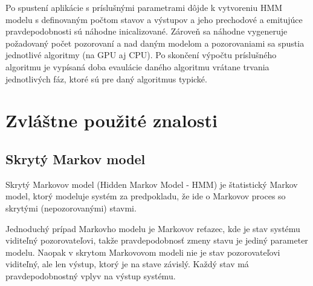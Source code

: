 \documentclass[11pt,a4paper]{article}
\begin{document}
\noindent Po spustení aplikácie s príslušnými parametrami dôjde k vytvoreniu HMM modelu s
definovaným počtom stavov a výstupov a jeho prechodové a emitujúce pravdepodobnosti sú náhodne inicalizované. Zároveň sa náhodne vygeneruje
požadovaný počet pozorovaní a nad daným modelom a pozorovaniami sa spustia jednotlivé algoritmy (na GPU aj CPU). Po skončení výpočtu príslušného algoritmu je vypísaná doba evaulácie daného algoritmu vrátane trvania jednotlivých fáz,
ktoré sú pre daný algoritmus typické.



\section{Zvláštne použité znalosti}

\subsection{Skrytý Markov model}

Skrytý Markovov model (Hidden Markov Model - HMM) je štatistický Markov model,
ktorý modeluje systém za predpokladu, že ide o Markovov proces so skrytými
(nepozorovanými) stavmi.

Jednoduchý prípad Markovho modelu je Markovov reťazec, kde je stav systému viditeľný pozorovateľovi, takže pravdepodobnosť zmeny stavu je jediný parameter modelu. Naopak v skrytom Markovovom modeli nie je stav pozorovateľovi viditeľný,
ale len výstup, ktorý je na stave závislý. Každý stav má pravdepodobnostný vplyv na výstup systému. \cite{hmm-wiki}
\end{document}
